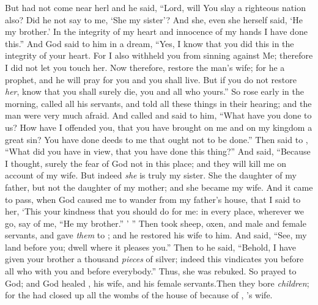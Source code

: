 \bverse But  had not come near herl and he said, ``Lord, will You slay a righteous nation also?
\bverse Did he not say to me, `She \is my sister'? And she, even she herself said, `He \is my brother.' In the integrity of my heart and innocence of my hands I have done this.''
\bverse And God said to him in a dream, ``Yes, I know that you did this in the integrity of your heart. For I also withheld you from sinning against Me; therefore I did not let you touch her.
\bverse Now therefore, restore the man's wife; for he \is a prophet, and he will pray for you and you shall live. But if you do not restore \textit{her}, know that you shall surely die, you and all who \are yours.''
\bverse So  rose early in the morning, called all his servants, and told all these things in their hearing; and the man were very much afraid.
\bverse And  called  and said to him, ``What have you done to us? How have I offended you, that you have brought on me and on my kingdom a great sin? You have done deeds to me that ought not to be done.''
\bverse Then  said to , ``What did you have in view, that you have done this thing?''
\bverse And  said, ``Because I thought, surely the fear of God \is not in this place; and they will kill me on account of my wife.
\bverse But indeed \textit{she} is truly my sister. She \is the daughter of my father, but not the daughter of my mother; and she became my wife.
\bverse And it came to pass, when God caused me to wander from my father's house, that I said to her, `This \is your kindness that you should do for me: in every place, wherever we go, say of me, ``He \is my brother.'' ' ''
\bverse Then  took sheep, oxen, and male and female servants, and gave \textit{them} to ; and he restored  his wife to him.
\bverse And  said, ``See, my land \is before you; dwell where it pleases you.''
\bverse Then to  he said, ``Behold, I have given your brother a thousand \textit{pieces} of silver; indeed this vindicates you before all who \are with you and before everybody.'' Thus, she was rebuked.
\bverse So  prayed to God; and God healed , his wife, and his female servants.Then they bore \textit{children};
\bverse for the \lord had closed up all the wombs of the house of  because of , 's wife.
